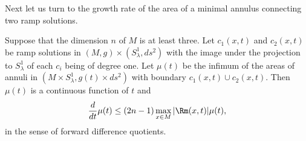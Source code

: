 Next let us turn to the growth rate of the area of a minimal annulus
connecting two ramp solutions.

\begin{lemma}
\label{lem:minimal-annulus-area-growth}
\label{mugrowth}
Suppose that the dimension $n$ of $ M$
is at least three. Let $c_1(x,t)$ and $c_2(x,t)$ be ramp solutions
in $( M, g)\times (S^1_\lambda,ds^2)$ with the image under the
projection to $S^1_\lambda$ of each $c_i$ being of degree one. Let
$\mu(t)$ be the infimum of the areas of annuli in $( M\times
S^1_\lambda, g(t)\times ds^2)$ with boundary $c_1(x,t)\cup
c_2(x,t)$. Then $\mu(t)$ is a continuous function of $t$ and
$$\frac{d}{dt}\mu(t)\le (2n-1)\max_{x\in M}|\Rm(x,t)|\mu(t),$$
in the sense of forward difference quotients.
\end{lemma}


